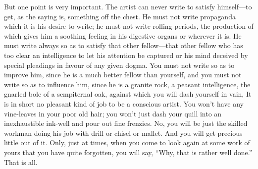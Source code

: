 But one point is very important. The artist can never write to satisfy
himself---to get, as the saying is, something off the chest. He must not
write propaganda which it is his desire to write; he must not write
rolling periods, the production of which gives him a soothing feeling in
his digestive organs or wherever it is. He must write always so as to
satisfy that other fellow---that other fellow who has too clear an
intelligence to let his attention be captured or his mind deceived by
special pleadings in favour of any given dogma. You must not write so as
to improve him, since he is a much better fellow than yourself, and you
must not write so as to influence him, since he is a granite rock, a
peasant intelligence, the gnarled bole of a sempiternal oak, against
which you will dash yourself in vain, It is in short no pleasant kind of
job to be a conscious artist. You won't have any vine-leaves in your
poor old hair; you won't just dash your quill into an inexhaustible
ink-well and pour out fine frenzies. No, you will be just the skilled
workman doing his job with drill or chisel or mallet. And you will get
precious little out of it. Only, just at times, when you come to look
again at some work of yours that you have quite forgotten, you will say,
``Why, that is rather well done.'' That is all.

